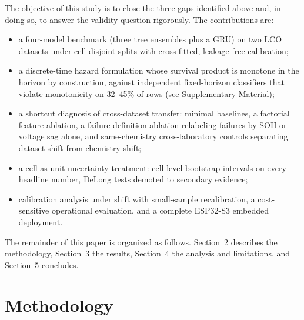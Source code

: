 \documentclass[preprint,12pt]{elsarticle}
\begin{document}
The objective of this study is to close the three gaps identified above and, in doing so, to answer the validity question rigorously. The contributions are:
\begin{itemize}
\item a four-model benchmark (three tree ensembles plus a GRU) on two LCO datasets under cell-disjoint splits with cross-fitted, leakage-free calibration;
\item a discrete-time hazard formulation whose survival product is monotone in the horizon by construction, against independent fixed-horizon classifiers that violate monotonicity on 32--45\% of rows (see Supplementary Material);
\item a shortcut diagnosis of cross-dataset transfer: minimal baselines, a factorial feature ablation, a failure-definition ablation relabeling failures by SOH or voltage sag alone, and same-chemistry cross-laboratory controls separating dataset shift from chemistry shift;
\item a cell-as-unit uncertainty treatment: cell-level bootstrap intervals on every headline number, DeLong tests demoted to secondary evidence;
\item calibration analysis under shift with small-sample recalibration, a cost-sensitive operational evaluation, and a complete ESP32-S3 embedded deployment.
\end{itemize}

The remainder of this paper is organized as follows. Section~2 describes the methodology, Section~3 the results, Section~4 the analysis and limitations, and Section~5 concludes.

\section{Methodology}
\end{document}
